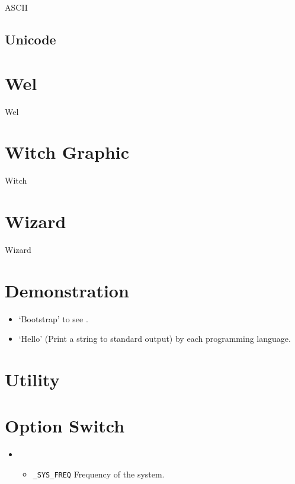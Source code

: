 {ASCII}

\subsection{Unicode}





\section{Wel}
{Wel}

\section{Witch Graphic}
{Witch}

\section{Wizard}
{Wizard}

\section{Demonstration}

\begin{itemize}
	\item `Bootstrap' to see .
	\item `Hello' (Print a string to standard output) by each programming language. 
\end{itemize}

\section{Utility}


\section{Option Switch}

\begin{itemize}
	\item {}\begin{itemize}
		\item \verb`_SYS_FREQ` Frequency of the system.
	\end{itemize}
\end{itemize}

